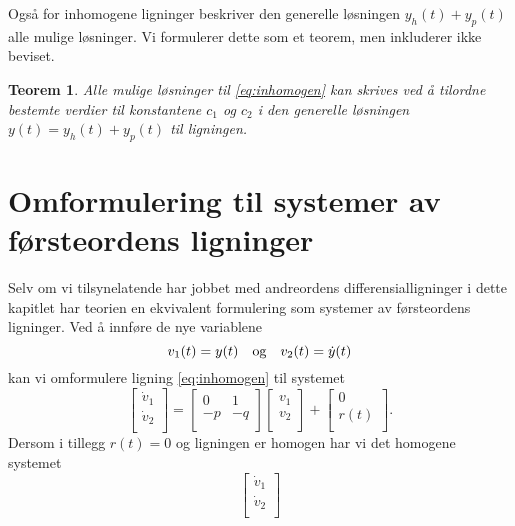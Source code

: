 \documentclass{article}
\newtheorem{thm}{Teorem}\surroundwithmdframed{thm}
\theoremstyle{definition}
\theoremstyle{remark}
\begin{document}
\begin{multicols*}{2}
Også for inhomogene ligninger beskriver den generelle løsningen $y_h(t) + y_p(t)$ alle mulige løsninger. Vi formulerer dette som et teorem, men inkluderer ikke beviset.

\begin{thm} \label{thm:alle_mulige_losn_inhomogen}
  Alle mulige løsninger til \eqref{eq:inhomogen} kan skrives ved å tilordne bestemte verdier til konstantene $c_1$ og $c_2$ i den generelle løsningen $y(t) = y_h(t) + y_p(t)$ til ligningen.
\end{thm}


\section*{Omformulering til systemer av førsteordens ligninger}
Selv om vi tilsynelatende har jobbet med andreordens differensialligninger i dette kapitlet har teorien en ekvivalent formulering som systemer av førsteordens ligninger. Ved å innføre de nye variablene
\begin{equation*}
  v_1(t) = y(t)\ \ \textnormal{ og }\ \ v_2(t) = \dot{y}(t)
\end{equation*}
kan vi omformulere ligning \eqref{eq:inhomogen} til systemet
\begin{equation*}
  \begin{bmatrix}
    \dot{v}_1 \\
    \dot{v}_2 \\
  \end{bmatrix}
  =
  \begin{bmatrix}
    0 & 1 \\
    -p & -q \\
  \end{bmatrix}
  \begin{bmatrix}
    v_1 \\
    v_2 \\
  \end{bmatrix}
  +
  \begin{bmatrix}
    0 \\
    r(t) \\
  \end{bmatrix}.
\end{equation*}
Dersom i tillegg $r(t) = 0$ og ligningen er homogen har vi det homogene systemet
\begin{equation*}
  \begin{bmatrix}
    \dot{v}_1 \\
    \dot{v}_2 \\
  \end{bmatrix}

\end{equation*}
\end{multicols*}
\end{document}
